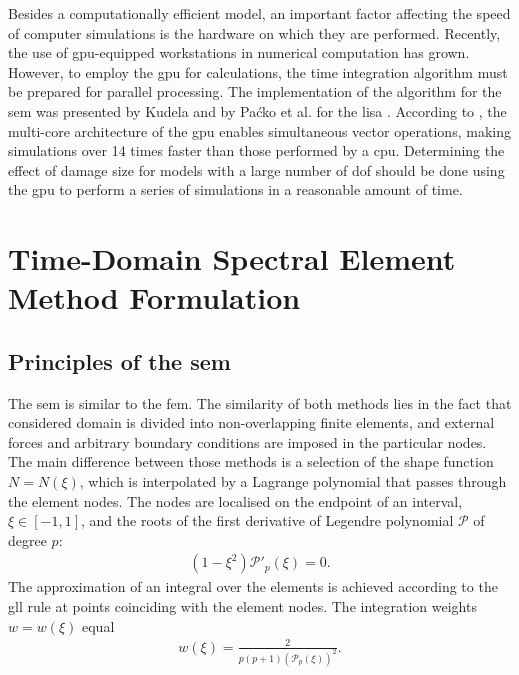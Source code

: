 \documentclass[a4paper,fleqn]{cas-dc}
\begin{document}
Besides a computationally efficient model, an important factor affecting the speed of computer simulations is the hardware on which they are performed.
Recently, the use of \ac{gpu}-equipped workstations in numerical computation has grown.
However, to employ the \ac{gpu} for calculations, the time integration algorithm must be prepared for parallel processing.
The implementation of the algorithm for the \ac{sem} was presented by Kudela \cite{kudela2016parallel} and by Paćko et al. for the \ac{lisa} \cite{packo2012lamb}.
According to \cite{kudela2016parallel}, the multi-core architecture of the \ac{gpu} enables simultaneous vector operations, making simulations over 14 times faster than those performed by a \ac{cpu}.
Determining the effect of damage size for models with a large number of \ac{dof} should be done using the \ac{gpu} to perform a series of simulations in a reasonable amount of time.

\section{Time-Domain Spectral Element Method Formulation}
\subsection{Principles of the \ac{sem}}

The \ac{sem} is similar to the \ac{fem}.
The similarity of both methods lies in the fact that considered domain is divided into non-overlapping finite elements, and external forces and arbitrary boundary conditions are imposed in the particular nodes.
The main difference between those methods is a selection of the shape function \( N=N(\xi )\), which is interpolated by a Lagrange polynomial that passes through the element nodes.
The nodes are localised on the endpoint of an interval, \(\xi\in[-1,1]\), and the roots of the first derivative of Legendre polynomial \(\mathcal{P}\) of degree \(p\):
\begin{eqnarray}
	(1-\xi^2)\mathcal{P}'_{p}(\xi)=0.
	\label{eq:nodes}
\end{eqnarray}
The approximation of an integral over the elements is achieved according to the \ac{gll} rule at points coinciding with the element nodes. The integration weights \(w=w(\xi)\) equal
\begin{eqnarray}
	{w(\xi)} = \frac{2}{p(p+1)(\mathcal{P}_{p}(\xi))^2}.
	\label{eq:weight}
\end{eqnarray}
\end{document}
